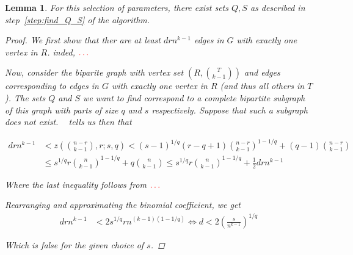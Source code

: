 \documentclass[12pt]{article}
\newtheorem{lemma}[thm]{Lemma}
\begin{document}
    \begin{lemma}\label{lemma:q_s}
        For this selection of parameters,
        there exist sets $Q, S$ as described in step~\ref{step:find_Q_S} of the algorithm.

        \begin{proof}
            We first show that ther are at least $drn^{k-1}$ edges in $G$ with exactly one vertex in $R$.
            inded, $\color{red}\ldots$ %

            Now, consider the biparite graph with vertex set $\left( R, \binom{T}{k-1} \right)$
            and edges corresponding to edges in $G$ with exactly one vertex in $R$ (and thus all others in $T$).
            The sets $Q$ and $S$ we want to find correspond to a complete bipartite subgraph of this graph
            with parts of size $q$ and $s$ respectively.
            Suppose that such a subgraph does not exist.
            ~\cite{Kovari1954} tells us then that

            \begin{align*}\label{eq:equation}
                drn^{k-1} & < z\left(\binom{n-r}{k-1}, r; s, q  \right) < (s-1)^{1/q}(r-q+1)\binom{n-r}{k-1}^{1-1/q} + (q-1)\binom{n-r}{k-1} \\
                           & \leq s^{1/q} r \binom{n}{k-1}^{1-1/q} + q \binom{n}{k-1} \leq s^{1/q} r \binom{n}{k-1}^{1-1/q} + \frac{1}{2} drn^{k-1}
            \end{align*}

            Where the last inequality follows from $\color{red} \ldots$

            Rearranging and approximating the binomial coefficient, we get
            \begin{align*}
                drn^{k-1} &< 2s^{1/q}r n^{(k-1)(1-1/q)} \iff d < 2 \left( \frac{s}{n^{k-1}} \right)^{1/q}
            \end{align*}

            Which is false for the given choice of $s$.

        \end{proof}

    \end{lemma}
\end{document}
